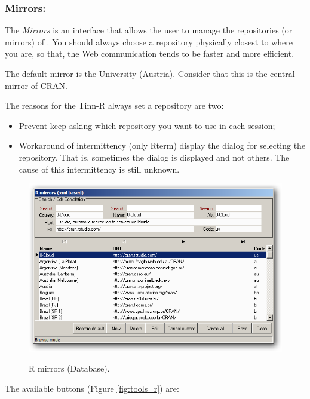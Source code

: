 \subsubsection{Mirrors:}

The \textit{Mirrors} is an interface that allows the user to manage the repositories (or mirrors) of \RR{}.
You should always choose a repository physically closest to where you are,
so that, the Web communication tends to be faster and more efficient.

The default mirror is the University 
(Austria). Consider that this is the central mirror of CRAN.

The reasons for the Tinn-R always set a repository are two:
\begin {itemize}
   \item Prevent \RR{} keep asking which repository you want to use in each session;
   \item Workaround of intermittency (only Rterm) display the dialog for selecting the repository.
    That is, sometimes the dialog is displayed and not others. The cause of this intermittency is still unknown.
\end {itemize}

\begin{figure}[h!]
  \includegraphics[scale=0.35]{./res/mirrors_dlg.png}\\
  \caption{R mirrors (Database).}
  \label{fig:mirrors_dlg}
\end{figure}

The available buttons
(Figure \ref{fig:tools_r})
are:

